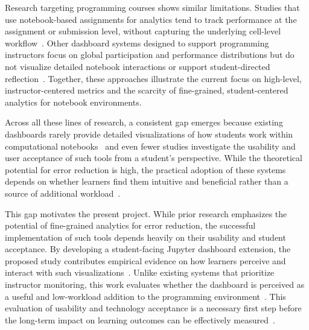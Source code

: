 Research targeting programming courses shows similar limitations. Studies that use notebook-based assignments for analytics tend to track performance at the assignment or submission level, without capturing the underlying cell-level workflow~\cite{sondagar2021elearning}. Other dashboard systems designed to support programming instructors focus on global participation and performance distributions but do not visualize detailed notebook interactions or support student-directed reflection~\cite{groher2024learning}. Together, these approaches illustrate the current focus on high-level, instructor-centered metrics and the scarcity of fine-grained, student-centered analytics for notebook environments.

Across all these lines of research, a consistent gap emerges because existing dashboards rarely provide detailed visualizations of how students work within computational notebooks~\cite{cai2025jupyter,JELAI} and even fewer studies investigate the usability and user acceptance of such tools from a student's perspective. While the theoretical potential for error reduction is high, the practical adoption of these systems depends on whether learners find them intuitive and beneficial rather than a source of additional workload~\cite{corrin2014exploring}.

This gap motivates the present project. While prior research emphasizes the potential of fine-grained analytics for error reduction, the successful implementation of such tools depends heavily on their usability and student acceptance. By developing a student-facing Jupyter dashboard extension, the proposed study contributes empirical evidence on how learners perceive and interact with such visualizations~\cite{schwendimann2016perceiving}. Unlike existing systems that prioritize instructor monitoring, this work evaluates whether the dashboard is perceived as a useful and low-workload addition to the programming environment~\cite{robinson2022error, paulsen2024learning}. This evaluation of usability and technology acceptance is a necessary first step before the long-term impact on learning outcomes can be effectively measured~\cite{corrin2014exploring}.
